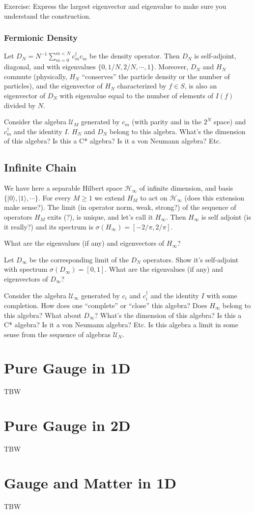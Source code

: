  	 Exercise: Express the largest eigenvector and eigenvalue to make sure you understand the construction.
 	 
 	 \subsubsection{Fermionic Density}
 	 Let $D_N=N^{-1}\sum_{m=0}^{m < N} c^\dagger_m c_m$ be the density operator. Then $D_N$ is self-adjoint, diagonal, and
 	 with eigenvalues $\{0, 1/N, 2/N, \cdots, 1\}$. Moreover, $D_N$ and $H_N$ commute (physically, $H_N$ ``conserves'' the particle density
 	 or the number of particles), and the eigenvector of $H_N$ characterized by $f\in S$, is also an eigenvector of $D_N$
 	 with eigenvalue equal to the number of elements of $I(f)$ divided by $N$.
 	 
 	 Consider the algebra $\mathcal{U}_M$ generated by $c_m$ (with parity and in the $2^N$ space) and $c^\dagger_m$ and the identity $I$.
 	 $H_N$ and $D_N$ belong to this algebra.
 	 What's the dimension of this algebra? Is this a C* algebra? Is it a von Neumann algebra? Etc.
 	 
 	 \subsection{Infinite Chain}
 	 We have here a separable Hilbert space $\mathcal{H}_\infty$ of infinite dimension,  and basis $\{|0\rangle, |1\rangle, \cdots\}$.
 	 	For every $M\ge 1$ we extend $H_M$ to act on $\mathcal{H}_\infty$ (does this extension make sense?).
 	 		The limit (in operator norm, weak, strong?) of the sequence of operators $H_M$ exits (?), is unique, and let's call it $H_\infty$.
 	 	Then $H_\infty$ is self adjoint (is it really?) and its spectrum is $\sigma(H_\infty) = [-2/\pi, 2/\pi]$.
 	 	
 	 	What are the eigenvalues (if any) and eigenvectors of $H_\infty$?
 	 	
 	 	Let $D_\infty$ be the corresponding limit of the $D_N$ operators. Show it's self-adjoint with spectrum $\sigma(D_\infty) = [0, 1]$.
 	 	What are the eigenvalues (if any) and eigenvectors of $D_\infty$?
 	 	
 	 Consider the algebra $\mathcal{U}_\infty$ generated by $c_i$ and $c^\dagger_i$ and the identity $I$ with some completion.
 	 How does one ``complete'' or ``close'' this algebra?
 	 Does $H_\infty$ belong to this algebra? What about $D_\infty$?
 	 What's the dimension of this algebra? Is this a C* algebra? Is it a von Neumann algebra? Etc.
 	 Is this algebra a limit in some sense from the sequence of algebras $\mathcal{U}_N$.
	\section{Pure Gauge in 1D}
TBW
	
	\section{Pure Gauge in 2D}
	TBW
	\section{Gauge and Matter in 1D}
	TBW
	
	
